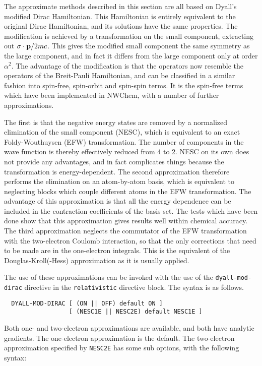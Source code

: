 The approximate methods described in this section are all based on Dyall's
modified Dirac Hamiltonian. This Hamiltonian is entirely equivalent to the
original Dirac Hamiltonian, and its solutions have the same properties.
The modification is achieved by a transformation on the small component,
extracting out $\sigma\cdot{\bf p}/2mc$. This gives the modified small
component the same symmetry as the large component, and in fact it differs
from the large component only at order $\alpha^2$.  The advantage of the
modification is that the operators now resemble the operators of the
Breit-Pauli Hamiltonian, and can be classified in a similar fashion into
spin-free, spin-orbit and spin-spin terms. It is the spin-free terms which
have been implemented in NWChem, with a number of further approximations.

The first is that the negative energy states are removed by a normalized
elimination of the small component (NESC), which is equivalent to an exact
Foldy-Wouthuysen (EFW) transformation. The number of components in the wave
function is thereby effectively reduced from 4 to 2. NESC on its own does
not provide any advantages, and in fact complicates things because the
transformation is energy-dependent. The second approximation therefore
performs the elimination on an atom-by-atom basis, which is equivalent to
neglecting blocks which couple different atoms in the EFW transformation.
The advantage of this approximation is that all the energy dependence can be
included in the contraction coefficients of the basis set.  The tests which
have been done show that this approximation gives results well within
chemical accuracy. The third approximation neglects the commutator of the
EFW transformation with the two-electron Coulomb interaction, so that the
only corrections that need to be made are in the one-electron integrals.
This is the equivalent of the Douglas-Kroll(-Hess) approximation as it is
usually applied.

The use of these approximations can be invoked with the use of the
\verb+dyall-mod-dirac+ directive in the \verb+relativistic+ directive block.
The syntax is as follows.

\begin{verbatim}
  DYALL-MOD-DIRAC [ (ON || OFF) default ON ] 
                  [ (NESC1E || NESC2E) default NESC1E ]

\end{verbatim}

Both one- and two-electron approximations are available, and both have
analytic gradients. The one-electron approximation is the default.
The two-electron approximation specified by \verb+NESC2E+ has some sub
options, with the following syntax:

